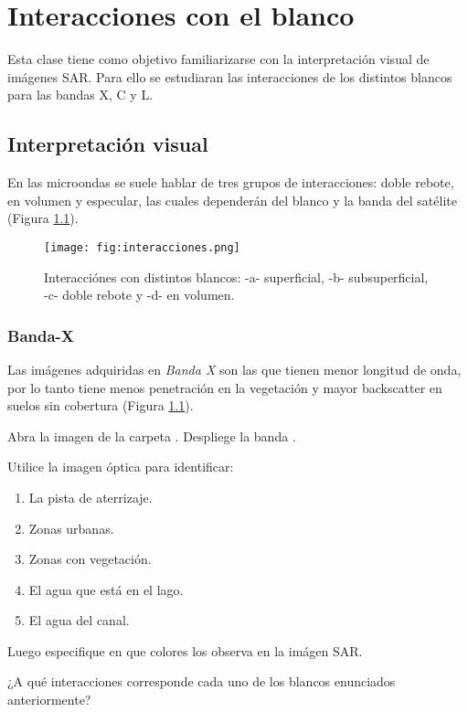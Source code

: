 \chapter{Interacciones con el blanco}

Esta clase tiene como objetivo familiarizarse con la interpretación visual de imágenes SAR. Para ello se estudiaran las interacciones de los distintos blancos para las bandas X, C y L.

\section{Interpretación visual}

En las microondas se suele hablar de tres grupos de interacciones: doble rebote, en volumen y especular, las cuales dependerán del blanco y la banda del satélite (Figura \ref{fig:interacciones}).

\begin{figure}[h!]
    \centering
    \texttt{[image: fig:interacciones.png]}
    \caption{Interacciónes con distintos blancos: -a- superficial, -b- subsuperficial, -c- doble rebote y -d- en volumen.}
    \label{fig:interacciones}
\end{figure}

\subsection{Banda-X}

Las imágenes adquiridas en \emph{Banda X} son las que tienen menor longitud de onda, por lo tanto tiene menos penetración en la vegetación y mayor backscatter en suelos sin cobertura (Figura \ref{fig:interacciones}).


Abra la imagen  de la carpeta . Despliege la banda .

Utilice la imagen óptica para identificar:

\begin{enumerate}
    \item La pista de aterrizaje.
    \item Zonas urbanas.
    \item Zonas con vegetación.
    \item El agua que está en el lago.
    \item El agua del canal.
\end{enumerate}
Luego especifique en que colores los observa en la imágen SAR.
\begin{que}
    ¿A qué interacciones corresponde cada uno de los blancos enunciados anteriormente?
\end{que}

